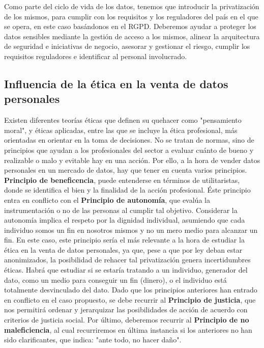 \documentclass{article}
\begin{document}
Como parte del ciclo de vida de los datos, tenemos que introducir la privatización de los mismos, para cumplir con los requisitos y los reguladores del país en el que se opera, en este caso basándonos en el RGPD. Deberemos ayudar a proteger los datos sensibles mediante la gestión de acceso a los mismos, alinear la arquitectura de seguridad e iniciativas de negocio, asesorar y gestionar el riesgo, cumplir los requisitos reguladores e identificar al personal involucrado.


\subsection{Influencia de la ética en la venta de datos personales}
Existen diferentes teorías éticas que definen su quehacer como "pensamiento moral", y éticas aplicadas, entre las que se incluye la ética profesional, más orientadas en orientar en la toma de decisiones. No se tratan de normas, sino de principios que ayudan a los profesionales del sector a evaluar cuánto de bueno y realizable o malo y evitable hay en una acción. Por ello, a la hora de vender datos personales en un mercado de datos, hay que tener en cuenta varios principios. \textbf{Principio de beneficencia}, puede entenderse en términos de utilitaristas, donde se identifica el bien y la finalidad de la acción profesional. Éste principio entra en conflicto con el \textbf{Principio de autonomía}, que evalúa la instrumentación o no de las personas al cumplir tal objetivo. Considerar la autonomía implica el respeto por la dignidad individual, asumiendo que cada individuo somos un fin en nosotros mismos y no un mero medio para alcanzar un fin. En este caso, este principio sería el más relevante a la hora de estudiar la ética en la venta de datos personales, ya que, pese a que por ley deban estar anonimizados, la posibilidad de rehacer tal privatización genera incertidumbres éticas. Habrá que estudiar si se estaría tratando a un individuo, generador del dato, como un medio para conseguir un fin (dinero), o el individuo está totalmente desvinculado del dato. Dado que los principios anteriores han entrado en conflicto en el caso propuesto, se debe recurrir al \textbf{Principio de justicia}, que nos permitirá ordenar y jerarquizar las posibilidades de acción de acuerdo con criterios de justicia social. Por último, deberemos recurrir al \textbf{Principio de no maleficiencia}, al cual recurriremos en última instancia si los anteriores no han sido clarificantes, que indica: "ante todo, no hacer daño".
\end{document}
